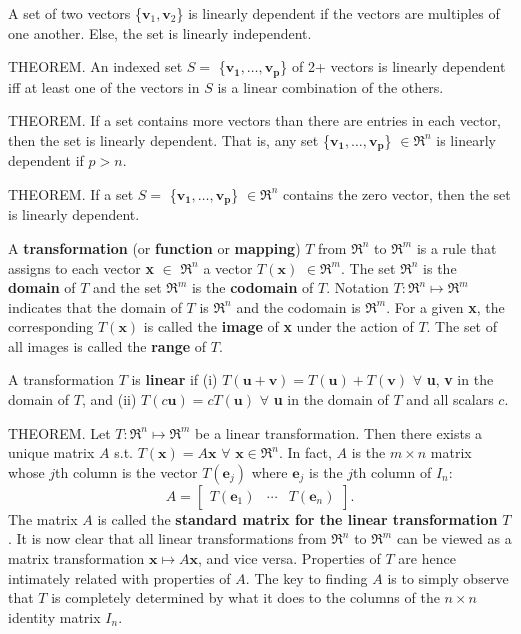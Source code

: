 \documentclass{article}
\begin{document}
\hfill \newline A set of two vectors \{$\textbf{v}_1, \textbf{v}_2$\} is linearly dependent if the vectors are multiples of one another. Else, the set is linearly independent.

\hfill \newline THEOREM. An indexed set $S = $ \{$\mathbf{v_1},\dots,\mathbf{v_p}$\} of 2+ vectors is linearly dependent iff at least one of the vectors in $S$ is a linear combination of the others.

\hfill \newline THEOREM. If a set contains more vectors than there are entries in each vector, then the set is linearly dependent. That is, any set \{$\mathbf{v_1},\dots,\mathbf{v_p}$\} $\in \Re^n$ is linearly dependent if $p>n$.

\hfill \newline THEOREM. If a set $S = $ \{$\mathbf{v_1},\dots,\mathbf{v_p}$\} $\in \Re^n$ contains the zero vector, then the set is linearly dependent.

\hfill \newline A \textbf{transformation} (or \textbf{function} or \textbf{mapping}) $T$ from $\Re^n$ to $\Re^m$ is a rule that assigns to each vector \textbf{x} $\in$ $\Re^n$ a vector $T(\textbf{x})$ $\in \Re^m$. The set $\Re^n$ is the \textbf{domain} of $T$ and the set $\Re^m$ is the \textbf{codomain} of $T$. Notation $T: \Re^n \mapsto \Re^m$ indicates that the domain of $T$ is $\Re^n$ and the codomain is $\Re^m$. For a given \textbf{x}, the corresponding $T(\textbf{x})$ is called the \textbf{image} of \textbf{x} under the action of $T$. The set of all images is called the \textbf{range} of $T$.

\hfill \newline A transformation $T$ is \textbf{linear} if (i) $T(\textbf{u}+\textbf{v})=T(\textbf{u})+T(\textbf{v})$ $\forall$ \textbf{u}, \textbf{v} in the domain of $T$, and (ii) $T(c\textbf{u})=cT(\textbf{u})$ $\forall$ \textbf{u} in the domain of $T$ and all scalars $c$.

\hfill \newline THEOREM. Let $T: \Re^n \mapsto \Re^m$ be a linear transformation. Then there exists a unique matrix $A$ s.t. $T(\textbf{x}) = A\textbf{x}$ $ \forall$ $\textbf{x} \in \Re^n$. In fact, $A$ is the $m \times n$ matrix whose $j$th column is the vector $T(\textbf{e}_j)$ where $\textbf{e}_j$ is the $j$th column of $I_n$:
\begin{equation}
    A = 
    \begin{bmatrix}
    T(\textbf{e}_1) & \cdots & T(\textbf{e}_n)
    \end{bmatrix}.
\end{equation}
\noindent The matrix $A$ is called the \textbf{standard matrix for the linear transformation} $T$. It is now clear that all linear transformations from $\Re^n$ to $\Re^m$ can be viewed as a matrix transformation $\textbf{x} \mapsto A\textbf{x}$, and vice versa. Properties of $T$ are hence intimately related with properties of $A$. The key to finding $A$ is to simply observe that $T$ is completely determined by what it does to the columns of the $n \times n$ identity matrix $I_n$.
\end{document}
